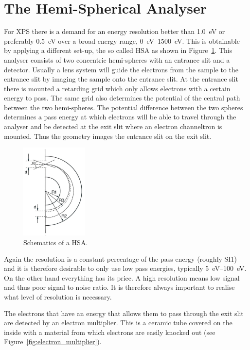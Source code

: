\section{The Hemi-Spherical Analyser}
For XPS there is a demand for an energy resolution better than \SI{1.0}{\electronvolt} or preferably \SI{0.5}{\electronvolt} over a broad energy range, \SIrange{0}{1500}{\electronvolt}. This is obtainable by applying a different set-up, the so called HSA as shown in Figure~\ref{fig:schematics_hsa}. This analyser consists of two concentric hemi-spheres with an entrance slit and a detector. Usually a lens system will guide the electrons from the sample to the entrance slit by imaging the sample onto the entrance slit. At the entrance slit there is mounted a retarding grid which only allows electrons with a certain energy to pass. The same grid also determines the potential of the central path between the two hemi-spheres. The potential difference between the two spheres determines a pass energy at which electrons will be able to travel through the analyser and be detected at the exit slit where an electron channeltron is mounted. Thus the geometry images the entrance slit on the exit slit.

\begin{figure}[htbp]
\centering
\includegraphics[width=0.3\textwidth]{figures/03_02}
\caption{Schematics of a HSA.}
\label{fig:schematics_hsa}
\end{figure}

Again the resolution is a constant percentage of the pass energy (roughly SI{1}{\percent}) and it is therefore desirable to only use low pass energies, typically \SIrange{5}{100}{\electronvolt}. On the other hand everything has its price. A high resolution means low signal and thus poor signal to noise ratio. It is therefore always important to realise what level of resolution is necessary.

The electrons that have an energy that allows them to pass through the exit slit are detected by an electron multiplier. This is a ceramic tube covered on the inside with a material from which electrons are easily knocked out (see Figure~\ref{fig:electron_multiplier}).

